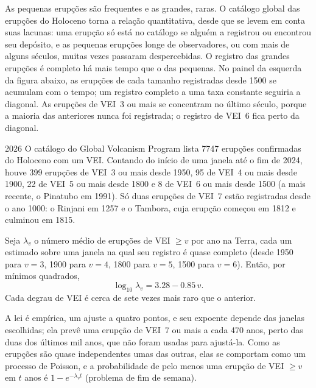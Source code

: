 As pequenas erupções são frequentes e as grandes, raras. O catálogo global das
erupções do Holoceno torna a relação quantitativa, desde que se levem em conta suas
lacunas: uma erupção só está no catálogo se alguém a registrou ou encontrou seu
depósito, e as pequenas erupções longe de observadores, ou com mais de alguns séculos,
muitas vezes passaram despercebidas. O registro das grandes erupções é completo há mais tempo que
o das pequenas. No painel da esquerda da figura abaixo, as erupções de cada
tamanho registradas desde 1500 se acumulam com o tempo; um registro completo a uma taxa constante
seguiria a diagonal. As erupções de VEI~3 ou mais se concentram no último
século, porque a maioria das anteriores nunca foi registrada; o registro de VEI~6
fica perto da diagonal.

\begin{dated}{2026}
O catálogo do Global Volcanism Program lista \num{7747} erupções confirmadas do Holoceno
com um VEI. Contando do início de uma janela até o fim de 2024, houve
399 erupções de VEI~3 ou mais desde 1950, 95 de VEI~4 ou mais desde 1900,
22 de VEI~5 ou mais desde 1800 e 8 de VEI~6 ou mais desde 1500 (a mais
recente, o Pinatubo em 1991). Só duas erupções de VEI~7 estão registradas desde o ano
1000: o Rinjani em 1257 e o Tambora, cuja erupção começou em 1812 e culminou em
1815.
\end{dated}

\begin{proposition}\label{prop:b2:eruptive-styles:frequency}
Seja $\lambda_v$ o número médio de erupções de VEI $\ge v$ por ano na Terra,
cada um estimado sobre uma janela na qual seu registro é quase completo (desde 1950
para $v = 3$, 1900 para $v = 4$, 1800 para $v = 5$, 1500 para $v = 6$). Então, por mínimos
quadrados,
\[
\log_{10}\lambda_v = 3.28 - 0.85\,v .
\]
Cada degrau de VEI é cerca de sete vezes mais raro que o anterior.
\end{proposition}

A lei é empírica, um ajuste a quatro pontos, e seu expoente depende das
janelas escolhidas; ela prevê uma erupção de VEI~7 ou mais a cada \num{470} anos,
perto das duas dos últimos mil anos, que não foram usadas para ajustá-la. Como
as erupções são quase independentes umas das outras, elas se comportam como um processo de
Poisson, e a probabilidade de pelo menos uma erupção de VEI $\ge v$ em $t$ anos
é $1 - e^{-\lambda_vt}$ (problema de fim de semana).

